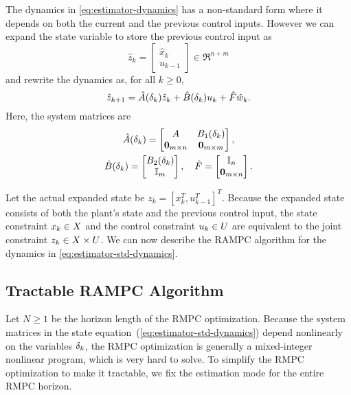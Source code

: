 The dynamics in \eqref{eq:estimator-dynamics} has a non-standard form
where it depends on both the current and the previous control inputs.
However we can expand the state variable to store the previous control
input as
\[
\hat{z}_{k}=\begin{bmatrix}\hat{x}_{k}\\
u_{k-1}
\end{bmatrix}\in\Re^{n+m}
\]
and rewrite the dynamics as, for all $k\geq0$,
\begin{equation}
\hat{z}_{k+1}=\hat{A}(\sDelay_k)\hat{z}_{k}+\hat{B}(\sDelay_k)u_{k}+\hat{F}\hat{w}_{k}\text{.}\label{eq:estimator-std-dynamics}
\end{equation}
Here, the system matrices are
\begin{equation}
\begin{gathered}
\hat{A}(\sDelay_k)=\begin{bmatrix}A & B_{1}(\sDelay_k)\\
\bm{0}_{m\times n} & \bm{0}_{m\times m}
\end{bmatrix},\\
\hat{B}(\sDelay_k)=\begin{bmatrix}B_{2}(\sDelay_k)\\
\IdentityMatrix_{m}
\end{bmatrix},\quad\hat{F}=\begin{bmatrix}\IdentityMatrix_{n}\\
\bm{0}_{m\times n}
\end{bmatrix}\text{.}
\end{gathered}
\label{eq:lifted-matrices}
\end{equation}

Let the actual expanded state be $z_{k}=\left[x_{k}^{T},u_{k-1}^{T}\right]^{T}$.
Because the expanded state consists of both the plant's state and
the previous control input, the state constraint $x_{k}\in X$
and the control constraint $u_{k}\in U$ are equivalent to the
joint constraint $z_{k}\in X\times U$. We can now describe
the RAMPC algorithm for the dynamics in \eqref{eq:estimator-std-dynamics}.

\subsection{Tractable RAMPC Algorithm}

Let $N\geq1$ be the horizon length of the RMPC optimization. 
Because the system
matrices in the state equation~(\ref{eq:estimator-std-dynamics})
depend nonlinearly on the variables $\delta_k$, the RMPC optimization
is generally a mixed-integer nonlinear program, which is very hard
to solve. To simplify the RMPC optimization to make it tractable, we fix the estimation mode for the entire RMPC horizon.

